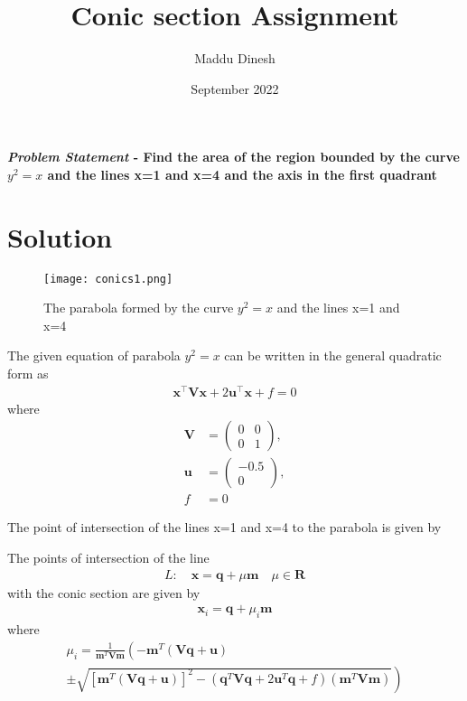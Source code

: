 \documentclass[journal,10pt,twocolumn]{article}
\title{\textbf{Conic section Assignment}}
\author{Maddu Dinesh}
\date{September 2022}
\let\vec\mathbf
\newcommand{\myvec}[1]{\ensuremath{\begin{pmatrix}#1\end{pmatrix}}}
\providecommand{\brak}[1]{\ensuremath{\left(#1\right)}}
\providecommand{\lbrak}[1]{\ensuremath{\left(#1\right.}}
\providecommand{\rbrak}[1]{\ensuremath{\left.#1\right)}}
\providecommand{\sbrak}[1]{\ensuremath{{}\left[#1\right]}}
\begin{document}
\maketitle
\paragraph{\textit{Problem Statement} - Find the area of the region bounded by the curve $y^2=x$ and the lines x=1 and x=4 and the axis in the first quadrant}

\section*{\large Solution}

\begin{figure}[h]
\centering
\texttt{[image: conics1.png]}

\caption{The parabola formed by the curve $y^2 = x$ and the lines x=1 and x=4}
\label{fig:parabola}
\end{figure}

The given equation of parabola $y^2 = x$ can be written in the general quadratic form as
\begin{align}
    \label{eq:conic_quad_form}
    \vec{x}^{\top}\vec{V}\vec{x}+2\vec{u}^{\top}\vec{x}+f=0
    \end{align}
where
\begin{align}
	\label{eq:V_matrix}
	\vec{V} &= \myvec{0 & 0\\0 & 1},
	\\
	\label{eq:u_vector}
	\vec{u} &= \myvec{-0.5\\0},
	\\
	\label{eq:f_value}
	f &= 0
\end{align}



The point of intersection of the lines x=1 and x=4 to the parabola is given by



The points of intersection of the line 
\begin{align}
	L: \quad \vec{x} = \vec{q} + \mu \vec{m} \quad \mu \in \mathbf{R}
\label{eq:conic_tangent}
\end{align}
with the conic section are given by
\begin{align}
\vec{x}_i = \vec{q} + \mu_i \vec{m}
\label{eq:conic_tangent_pts}
\end{align}
%
where
{\tiny
\begin{multline}
\mu_i = \frac{1}
{
\vec{m}^T\vec{V}\vec{m}
}
\lbrak{-\vec{m}^T\brak{\vec{V}\vec{q}+\vec{u}}}
\\
\pm
\rbrak{\sqrt{
\sbrak{
\vec{m}^T\brak{\vec{V}\vec{q}+\vec{u}}
}^2
-
\brak
{
\vec{q}^T\vec{V}\vec{q} + 2\vec{u}^T\vec{q} +f
}
\brak{\vec{m}^T\vec{V}\vec{m}}
}
}
\label{eq:tangent_roots}
\end{multline}
}
\end{document}
